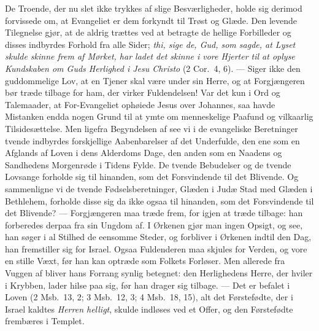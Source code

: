 \documentclass[12pt,a4paper]{book}
\begin{document}
De Troende, der nu slet ikke trykkes af slige Besværligheder, holde sig derimod
forvissede om, at Evangeliet er dem forkyndt til Trøst og Glæde. Den levende
Tilegnelse gjør, at de aldrig trættes ved at betragte de hellige Forbilleder og
disses indbyrdes Forhold fra alle Sider; \emph{thi, sige de, Gud, som sagde, at
Lyset skulde skinne frem af Mørket, har ladet det skinne i vore Hjerter til at
oplyse Kundskaben om Guds Herlighed i Jesu Christo} (2 Cor.\ 4, 6).
--- Siger ikke den guddommelige Lov, at en Tjener skal være under sin Herre, og
at Forgjængeren bør træde tilbage for ham, der virker Fuldendelsen! Var det kun i
Ord og Talemaader, at For-Evangeliet ophøiede Jesus over Johannes, saa havde
Mistanken endda nogen Grund til at ymte om menneskelige Paafund og vilkaarlig
Tilsidesættelse. Men ligefra Begyndelsen af see vi i de evangeliske Beretninger
tvende indbyrdes forskjellige Aabenbarelser af det Underfulde, den ene som en
Afglands af Loven i dens Alderdoms
Dage, den anden som en Naadens og Sandhedens Morgenrøde i Tidens Fylde. De
tvende Bebudelser og de tvende Lovsange forholde sig til hinanden, som det
Forsvindende til det Blivende. Og sammenligne vi de tvende Fødselsberetninger,
Glæden i Judæ Stad med Glæden i Bethlehem, forholde disse sig da ikke ogsaa til
hinanden, som det Forsvindende til det Blivende? --- Forgjængeren maa træde frem,
for igjen at træde tilbage: han forberedes derpaa fra sin Ungdom af. I Ørkenen
gjør man ingen Opsigt, og see, han søger i al Stilhed de eensomme Steder, og
forbliver i Ørkenen indtil den Dag, han fremstiller sig for Israel. Ogsaa
Fuldenderen maa skjules for Verden, og vore en stille Væxt, før han kan optræde
som Folkets Forløser. Men allerede fra Vuggen af bliver hans Forrang synlig
betegnet: den Herlighedens Herre, der hviler i Krybben, lader hilse paa sig, før
han drager sig tilbage. --- Det er befalet i Loven (2 Msb.\ 13, 2; 3 Msb.\ 12,
3; 4 Msb.\ 18, 15), alt det Førstefødte, der i Israel kaldtes \emph{Herren
helligt}, skulde indløses ved et Offer, og den Førstefødte frembæres i Templet.
\end{document}
